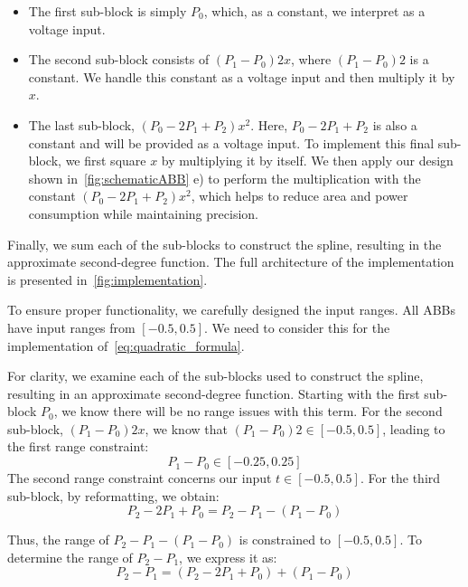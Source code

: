 \begin{itemize}
    \item The first sub-block is simply $P_{0}$, which, as a constant, we interpret as a voltage input. 
    \item The second sub-block consists of $(P_{1}-P_{0})2x$, where $(P_{1}-P_{0})2$ is a constant.
We handle this constant as a voltage input and then multiply it by $x$.
    \item The last sub-block, $(P_{0}-2P_{1}+P_{2})x^2$. Here, $P_{0}-2P_{1}+P_{2}$ is also a constant and will be provided as a voltage input.
To implement this final sub-block, we first square $x$ by multiplying it by itself. We then apply our design shown in~\autoref{fig:schematicABB} e) to perform the multiplication with the constant $(P_{0}-2P_{1}+P_{2})x^2$, which helps to reduce area and power consumption while maintaining precision.
\end{itemize} 
Finally, we sum each of the sub-blocks to construct the spline, resulting in the approximate second-degree function. The full architecture of the implementation is presented in~\autoref{fig:implementation}.

To ensure proper functionality, we carefully designed the input ranges. All ABBs have input ranges from $[-0.5, 0.5]$. We need to consider this for the implementation of~\autoref{eq:quadratic_formula}.

For clarity, we examine each of the sub-blocks used to construct the spline, resulting in an approximate second-degree function. Starting with the first sub-block $P_0$, we know there will be no range issues with this term.
For the second sub-block, $(P_1 - P_0) 2x$, we know that $(P_1 - P_0) 2 \in [-0.5, 0.5]$, leading to the first range constraint: 
\begin{equation*}
    P_1 - P_0 \in [-0.25, 0.25]
\end{equation*}
The second range constraint concerns our input $t \in [-0.5, 0.5]$.
For the third sub-block, by reformatting, we obtain:
\begin{equation*}
    P_2 - 2P_1 + P_0 = P_2 - P_1 - (P_1 - P_0)
\end{equation*}

Thus, the range of $P_2 - P_1 - (P_1 - P_0)$ is constrained to $[-0.5, 0.5]$. To determine the range of $P_2 - P_1$, we express it as:
\begin{equation*}
    P_2 - P_1 = (P_2 - 2P_1 + P_0) + (P_1 - P_0)
\end{equation*}

